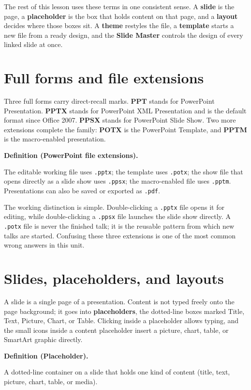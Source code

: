 \documentclass[11pt]{article}
\newenvironment{definitionbox}[1]{%
  \par\noindent\textbf{Definition (#1).}\ \itshape
}{\par\vspace{0.3em}}
\begin{document}
The rest of this lesson uses these terms in one consistent sense. A
\textbf{slide} is the page, a \textbf{placeholder} is the box that holds
content on that page, and a \textbf{layout} decides where those boxes sit. A
\textbf{theme} restyles the file, a \textbf{template} starts a new file from a
ready design, and the \textbf{Slide Master} controls the design of every
linked slide at once.

\section{Full forms and file extensions}
Three full forms carry direct-recall marks. \textbf{PPT} stands for PowerPoint
Presentation. \textbf{PPTX} stands for PowerPoint XML Presentation and is the
default format since Office 2007. \textbf{PPSX} stands for PowerPoint Slide
Show. Two more extensions complete the family: \textbf{POTX} is the PowerPoint
Template, and \textbf{PPTM} is the macro-enabled presentation.

\begin{definitionbox}{PowerPoint file extensions}
The editable working file uses \texttt{.pptx}; the template uses
\texttt{.potx}; the show file that opens directly as a slide show uses
\texttt{.ppsx}; the macro-enabled file uses \texttt{.pptm}. Presentations can
also be saved or exported as \texttt{.pdf}.
\end{definitionbox}

The working distinction is simple. Double-clicking a \texttt{.pptx} file opens
it for editing, while double-clicking a \texttt{.ppsx} file launches the
slide show directly. A \texttt{.potx} file is never the finished talk; it is
the reusable pattern from which new talks are started. Confusing these three
extensions is one of the most common wrong answers in this unit.

\section{Slides, placeholders, and layouts}
A slide is a single page of a presentation. Content is not typed freely onto
the page background; it goes into \textbf{placeholders}, the dotted-line boxes
marked Title, Text, Picture, Chart, or Table. Clicking inside a placeholder
allows typing, and the small icons inside a content placeholder insert a
picture, chart, table, or SmartArt graphic directly.

\begin{definitionbox}{Placeholder}
A dotted-line container on a slide that holds one kind of content (title,
text, picture, chart, table, or media).
\end{definitionbox}
\end{document}
